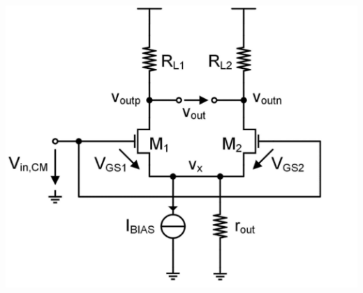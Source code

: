 \documentclass[5pt]{article}
\begin{document}
\begin{multicols*}{4}
\includegraphics[width=0.8\columnwidth]{images/cmrr_diff_pair.png}\\

\end{multicols*}
\end{document}
